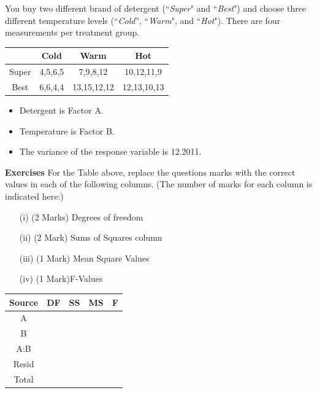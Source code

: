 \documentclass[a4paper,12pt]{article}
\begin{document}
	
	\noindent You buy two different brand of detergent (``\textit{Super}" and ``\textit{Best}") and choose three different temperature levels (``\textit{Cold}”, ``\textit{Warm}", and ``\textit{Hot}"). There are four measurements per treatment group.
	{
		\Large
		\begin{center}
			\begin{tabular}{|c||c|c|c|}
				\hline
				& Cold & Warm & Hot  \\ \hline \hline
				Super &  4,5,6,5    & 7,9,8,12     &  10,12,11,9    \\  \hline
				Best  &  6,6,4,4    & 13,15,12,12    & 12,13,10,13     \\  \hline
			\end{tabular} 
		\end{center}
	}
	\begin{itemize}
		\item Detergent is Factor A.
		\item Temperature is Factor B.
		\item The variance of the response variable is 12.2011.
	\end{itemize}
\noindent \textbf{Exercises}
For the Table above, replace the questions marks with the correct values in each of the following columns. (The number of marks for each column is indicated here:)
\begin{itemize}
	\item[(i)] (2 Marks) Degrees of freedom 
	\item[(ii)](2 Mark) Sums of Squares column
	\item[(iii)](1 Mark) Mean Square Values
	\item[(iv)](1 Mark)F-Values
\end{itemize}


{
	\large
	\begin{center}
		\begin{center}
			\begin{tabular}{|c|c|c|c|c|}\hline
				Source & DF & SS & MS & F \\ \hline
				A  & \phantom{makespace}  & \phantom{makespace} & \phantom{makespace} & \phantom{makespace} \\ \hline
				B  &\phantom{makespace} & \phantom{makespace}  & \phantom{makespace}& \phantom{makespace} \\ \hline
				A:B  & \phantom{makespace}& \phantom{makespace} & \phantom{makespace} & \phantom{makespace} \\ \hline
				Resid & \phantom{makespace}& \phantom{makespace} & \phantom{makespace} & \\ \hline \hline
				Total & \phantom{makespace}&\phantom{makespace}  & \phantom{spa} & \\  \hline
			\end{tabular} 
		\end{center}
	\end{center}
}
\end{document}
